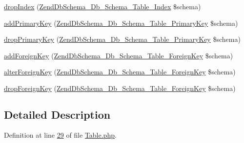 \begin{DoxyCompactItemize}
\hyperlink{interfaceZendDbSchema__Db__Schema__Generator__Table_a0a533a12039bfdd7e6a10f5a639463c7}{drop\-Index} (\hyperlink{classZendDbSchema__Db__Schema__Table__Index}{Zend\-Db\-Schema\-\_\-\-Db\-\_\-\-Schema\-\_\-\-Table\-\_\-\-Index} \$schema)
\item 
\hyperlink{interfaceZendDbSchema__Db__Schema__Generator__Table_a3a7755a8832ae753dac4aab13321f9ee}{add\-Primary\-Key} (\hyperlink{classZendDbSchema__Db__Schema__Table__PrimaryKey}{Zend\-Db\-Schema\-\_\-\-Db\-\_\-\-Schema\-\_\-\-Table\-\_\-\-Primary\-Key} \$schema)
\item 
\hyperlink{interfaceZendDbSchema__Db__Schema__Generator__Table_a7b21ee6731b9ee689e6f9faa4c0cc330}{drop\-Primary\-Key} (\hyperlink{classZendDbSchema__Db__Schema__Table__PrimaryKey}{Zend\-Db\-Schema\-\_\-\-Db\-\_\-\-Schema\-\_\-\-Table\-\_\-\-Primary\-Key} \$schema)
\item 
\hyperlink{interfaceZendDbSchema__Db__Schema__Generator__Table_aff7ec9002b094d3a62ec8bc79cf47931}{add\-Foreign\-Key} (\hyperlink{classZendDbSchema__Db__Schema__Table__ForeignKey}{Zend\-Db\-Schema\-\_\-\-Db\-\_\-\-Schema\-\_\-\-Table\-\_\-\-Foreign\-Key} \$schema)
\item 
\hyperlink{interfaceZendDbSchema__Db__Schema__Generator__Table_a2fc61d462395b556b532e6f7db3c5462}{alter\-Foreign\-Key} (\hyperlink{classZendDbSchema__Db__Schema__Table__ForeignKey}{Zend\-Db\-Schema\-\_\-\-Db\-\_\-\-Schema\-\_\-\-Table\-\_\-\-Foreign\-Key} \$schema)
\item 
\hyperlink{interfaceZendDbSchema__Db__Schema__Generator__Table_a189e95138e1281c4722b6610b4313b67}{drop\-Foreign\-Key} (\hyperlink{classZendDbSchema__Db__Schema__Table__ForeignKey}{Zend\-Db\-Schema\-\_\-\-Db\-\_\-\-Schema\-\_\-\-Table\-\_\-\-Foreign\-Key} \$schema)
\end{DoxyCompactItemize}


\subsection{Detailed Description}


Definition at line \hyperlink{Generator_2Table_8php_source_l00029}{29} of file \hyperlink{Generator_2Table_8php_source}{Table.\-php}.



